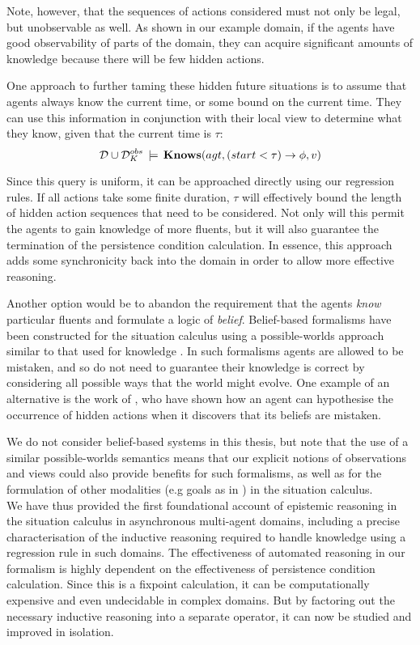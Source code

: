 Note, however, that the sequences of actions considered must not only
be legal, but unobservable as well. As shown in our example domain,
if the agents have good observability of parts of the domain, they
can acquire significant amounts of knowledge because there will be
few hidden actions.

One approach to further taming these hidden future situations is to
assume that agents always know the current time, or some bound on
the current time. They can use this information in conjunction with
their local view to determine what they know, given that the current
time is $\tau$:\[
\mathcal{D}\cup\mathcal{D}_{K}^{obs}\,\models\,\mathbf{Knows}(agt,(start<\tau)\rightarrow\phi,v)\]


Since this query is uniform, it can be approached directly using our
regression rules. If all actions take some finite duration, $\tau$
will effectively bound the length of hidden action sequences that
need to be considered. Not only will this permit the agents to gain
knowledge of more fluents, but it will also guarantee the termination
of the persistence condition calculation. In essence, this approach
adds some synchronicity back into the domain in order to allow more
effective reasoning.

Another option would be to abandon the requirement that the agents
\emph{know} particular fluents and formulate a logic of \emph{belief}.
Belief-based formalisms have been constructed for the situation calculus
using a possible-worlds approach similar to that used for knowledge
\citep{shapiro00sc_belief}. In such formalisms agents are allowed
to be mistaken, and so do not need to guarantee their knowledge is
correct by considering all possible ways that the world might evolve.
One example of an alternative is the work of \citet{shapiro04sc_belief_exog},
who have shown how an agent can hypothesise the occurrence of hidden
actions when it discovers that its beliefs are mistaken.

We do not consider belief-based systems in this thesis, but note that
the use of a similar possible-worlds semantics means that our explicit
notions of observations and views could also provide benefits for
such formalisms, as well as for the formulation of other modalities
(e.g goals as in \citep{shapiro07sc_goal_change}) in the situation
calculus.\\


We have thus provided the first foundational account of epistemic
reasoning in the situation calculus in asynchronous multi-agent domains,
including a precise characterisation of the inductive reasoning required
to handle knowledge using a regression rule in such domains. The effectiveness
of automated reasoning in our formalism is highly dependent on the
effectiveness of persistence condition calculation. Since this is
a fixpoint calculation, it can be computationally expensive and even
undecidable in complex domains. But by factoring out the necessary
inductive reasoning into a separate operator, it can now be studied
and improved in isolation.

